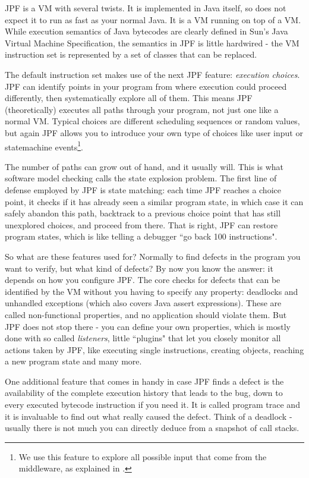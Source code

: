 JPF is a VM with several twists. It is implemented in Java itself, so does not expect it to run as fast as your normal Java. It is a VM running on top of a VM. While execution semantics of Java bytecodes are clearly defined in Sun's Java Virtual Machine Specification, the semantics in JPF is little hardwired  - the VM instruction set is represented by a set of classes that can be replaced.

The default instruction set makes use of the next JPF feature: \emph{execution choices}. JPF can identify points in your program from where execution could proceed differently, then systematically explore all of them. This means JPF (theoretically) executes all paths through your program, not just one like a normal VM. Typical choices are different scheduling sequences or random values, but again JPF allows you to introduce your own type of choices like user input or statemachine events\footnote{We use this feature to explore all possible input that come from the \coco middleware, as explained in .}.

The number of paths can grow out of hand, and it usually will. This is what software model checking calls the state explosion problem. The first line of defense employed by JPF is state matching: each time JPF reaches a choice point, it checks if it has already seen a similar program state, in which case it can safely abandon this path, backtrack to a previous choice point that has still unexplored choices, and proceed from there. That is right, JPF can restore program states, which is like telling a debugger ``go back 100 instructions".

So what are these features used for? Normally to find defects in the program you want to verify, but what kind of defects? By now you know the answer: it depends on how you configure JPF. The core checks for defects that can be identified by the VM without you having to specify any property: deadlocks and unhandled exceptions (which also covers Java assert expressions). These are called non-functional properties, and no application should violate them. But JPF does not stop there - you can define your own properties, which is mostly done with so called \emph{listeners}, little ``plugins" that let you closely monitor all actions taken by JPF, like executing single instructions, creating objects, reaching a new program state and many more. 

One additional feature that comes in handy in case JPF finds a defect is the availability of the complete execution history that leads to the bug, down to every executed bytecode instruction if you need it. It is called program trace and it is invaluable to find out what really caused the defect. Think of a deadlock - usually there is not much you can directly deduce from a snapshot of call stacks.

